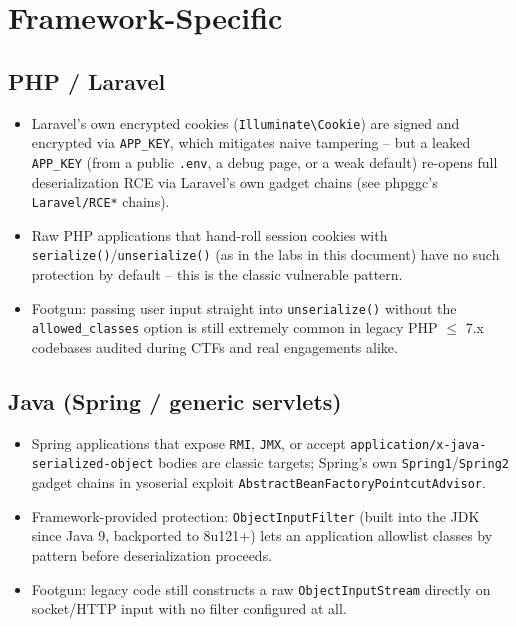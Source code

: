 \documentclass[11pt]{article}
\begin{document}
\section{Framework-Specific}

\subsection{PHP / Laravel}
\begin{itemize}
    \item Laravel's own encrypted cookies (\verb|Illuminate\Cookie|) are signed and encrypted via \texttt{APP\_KEY}, which mitigates naive tampering -- but a leaked \texttt{APP\_KEY} (from a public \texttt{.env}, a debug page, or a weak default) re-opens full deserialization RCE via Laravel's own gadget chains (see phpggc's \texttt{Laravel/RCE*} chains).
    \item Raw PHP applications that hand-roll session cookies with \verb|serialize()|/\verb|unserialize()| (as in the labs in this document) have no such protection by default -- this is the classic vulnerable pattern.
    \item Footgun: passing user input straight into \verb|unserialize()| without the \verb|allowed_classes| option is still extremely common in legacy PHP $\leq$ 7.x codebases audited during CTFs and real engagements alike.
\end{itemize}

\subsection{Java (Spring / generic servlets)}
\begin{itemize}
    \item Spring applications that expose \texttt{RMI}, \texttt{JMX}, or accept \texttt{application/x-java-serialized-object} bodies are classic targets; Spring's own \texttt{Spring1}/\texttt{Spring2} gadget chains in ysoserial exploit \texttt{AbstractBeanFactoryPointcutAdvisor}.
    \item Framework-provided protection: \texttt{ObjectInputFilter} (built into the JDK since Java 9, backported to 8u121+) lets an application allowlist classes by pattern before deserialization proceeds.
    \item Footgun: legacy code still constructs a raw \texttt{ObjectInputStream} directly on socket/HTTP input with no filter configured at all.
\end{itemize}
\end{document}
